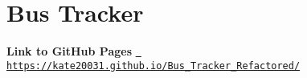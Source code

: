 \chapter{Bus Tracker}
\hypertarget{index}{}\label{index}
\label{index_md_README}%
%
 {\bfseries{Link to Git\+Hub Pages}} \href{https://kate20031.github.io/Bus_Tracker_Refactored/}{\texttt{ https\+://kate20031.\+github.\+io/\+Bus\+\_\+\+Tracker\+\_\+\+Refactored/}} 